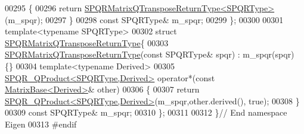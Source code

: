 \begin{DoxyCode}
00295 \textcolor{keyword}{  }\{
00296     \textcolor{keywordflow}{return} \hyperlink{struct_eigen_1_1_s_p_q_r_matrix_q_transpose_return_type}{SPQRMatrixQTransposeReturnType<SPQRType>}(m\_spqr);
00297   \}
00298   \textcolor{keyword}{const} SPQRType& m\_spqr;
00299 \};
00300 
00301 \textcolor{keyword}{template}<\textcolor{keyword}{typename} SPQRType>
00302 \textcolor{keyword}{struct }\hyperlink{struct_eigen_1_1_s_p_q_r_matrix_q_transpose_return_type}{SPQRMatrixQTransposeReturnType}\{
00303   \hyperlink{struct_eigen_1_1_s_p_q_r_matrix_q_transpose_return_type}{SPQRMatrixQTransposeReturnType}(\textcolor{keyword}{const} SPQRType& spqr) : m\_spqr(spqr) \{\}
00304   \textcolor{keyword}{template}<\textcolor{keyword}{typename} Derived>
00305   \hyperlink{struct_eigen_1_1_s_p_q_r___q_product}{SPQR\_QProduct<SPQRType,Derived>} operator*(\textcolor{keyword}{const} 
      \hyperlink{group___core___module_class_eigen_1_1_matrix_base}{MatrixBase<Derived>}& other)
00306   \{
00307     \textcolor{keywordflow}{return} \hyperlink{struct_eigen_1_1_s_p_q_r___q_product}{SPQR\_QProduct<SPQRType,Derived>}(m\_spqr,other.derived(), \textcolor{keyword}{true});
00308   \}
00309   \textcolor{keyword}{const} SPQRType& m\_spqr;
00310 \};
00311 
00312 \}\textcolor{comment}{// End namespace Eigen}
00313 \textcolor{preprocessor}{#endif}
\end{DoxyCode}
